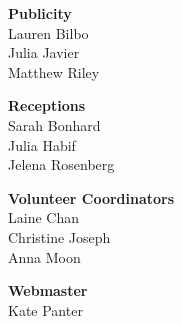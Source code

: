 \documentclass[twoside]{article}
\begin{document}
\begin{multicols}{2}
\begin{minipage}{\columnwidth}
\end{minipage}
    \begin{minipage}{\columnwidth}
    {\bf Publicity}\\
    Lauren Bilbo\\
    Julia Javier\\
    Matthew Riley\\
    
\end{minipage}
    \begin{minipage}{\columnwidth}
    {\bf Receptions}\\
    Sarah Bonhard\\
    Julia Habif\\
    Jelena Rosenberg\\
    
\end{minipage}
    \begin{minipage}{\columnwidth}
    {\bf Volunteer Coordinators}\\
    Laine Chan\\
    Christine Joseph\\
    Anna Moon\\
    
\end{minipage}
    \begin{minipage}{\columnwidth}
    {\bf Webmaster}\\
    Kate Panter\\
    

\end{minipage}
\end{multicols}
\end{document}
